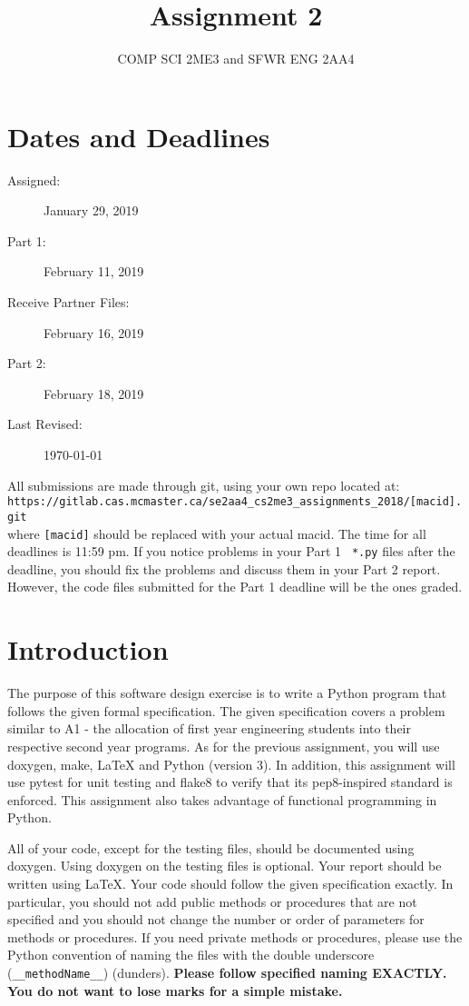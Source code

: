 \documentclass[12pt]{article}
\title{Assignment 2}
\author{COMP SCI 2ME3 and SFWR ENG 2AA4}
\newcommand{\latex}{\LaTeX\xspace}
\begin{document}
\maketitle

\section{Dates and Deadlines}

\begin{description}
\item [Assigned:] January 29, 2019
\item [Part 1:]  February 11, 2019
\item [Receive Partner Files:] February 16, 2019
\item [Part 2:] February 18, 2019
\item [Last Revised:] \today
\end{description}

\noindent All submissions are made through git, using your own repo located at:\\

\texttt{https://gitlab.cas.mcmaster.ca/se2aa4\_cs2me3\_assignments\_2018/[macid].git}\\

\noindent where \texttt{[macid]} should be replaced with your actual macid.  The
time for all deadlines is 11:59 pm.  If you notice problems in your Part 1 {\tt
  *.py} files after the deadline, you should fix the problems and discuss them
in your Part 2 report.  However, the code files submitted for the Part 1
deadline will be the ones graded.

\section{Introduction}

The purpose of this software design exercise is to write a Python program that
follows the given formal specification.  The given specification covers a
problem similar to A1 - the allocation of first year engineering students into
their respective second year programs.  As for the previous assignment, you will
use doxygen, make, LaTeX and Python (version 3).  In addition, this assignment
will use pytest for unit testing and flake8 to verify that its
pep8-inspired standard is enforced.  This assignment also takes
advantage of functional programming in Python.

All of your code, except for the testing files, should be documented using
doxygen.  Using doxygen on the testing files is optional.  Your report should be
written using \latex.  Your code should follow the given specification exactly.
In particular, you should not add public methods or procedures that are not
specified and you should not change the number or order of parameters for
methods or procedures.  If you need private methods or procedures, please use
the Python convention of naming the files with the double underscore
(\texttt{\_\_methodName\_\_}) (dunders).  \textbf{Please follow specified naming
  EXACTLY.  You do not want to lose marks for a simple mistake.}
\end{document}

